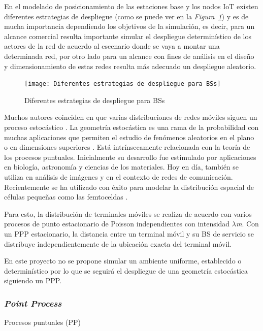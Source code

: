 En el modelado de posicionamiento de las estaciones base y los nodos IoT existen diferentes estrategias de despliegue (como se puede ver en la \textit{Figura~\ref{fig:BSs}}) y es de mucha importancia dependiendo los objetivos de la simulación, es decir, para un alcance comercial resulta importante simular el despliegue determinístico de los actores de la red de acuerdo al escenario donde se vaya a montar una determinada red, por otro lado para un alcance con fines de análisis en el diseño y dimensionamiento de estas redes resulta más adecuado un despliegue aleatorio. \newline

\begin{figure}[th]
\centering
\texttt{[image: Diferentes estrategias de despliegue para BSs]}
\decoRule
\caption[Diferentes estrategias de despliegue para BSs]{Diferentes estrategias de despliegue para BSs}
\label{fig:BSs}
\end{figure}

Muchos autores coinciden en que varias distribuciones de redes móviles siguen un proceso estocástico \parencite{Kouzayha2018}\parencite{Zhang2017}. La geometría estocástica es una rama de la probabilidad con muchas aplicaciones que permiten el estudio de fenómenos aleatorios en el plano o en dimensiones superiores \parencite{Haenggi2009}. Está intrínsecamente relacionada con la teoría de los procesos puntuales. Inicialmente su desarrollo fue estimulado por aplicaciones en biología, astronomía y ciencias de los materiales. Hoy en día, también se utiliza en análisis de imágenes y en el contexto de redes de comunicación. Recientemente se ha utilizado con éxito para modelar la distribución espacial de células pequeñas como las femtoceldas \parencite{TurjmanSmallCells}. \newline

Para esto, la distribución de terminales móviles se realiza de acuerdo con varios procesos de punto estacionario de Poisson independientes con intensidad \textit{$\lambda$m}. Con un PPP estacionario, la distancia entre un terminal móvil y su BS de servicio se distribuye independientemente de la ubicación exacta del terminal móvil.\newline

En este proyecto no se propone simular un ambiente uniforme, establecido o determinístico por lo que se seguirá el despliegue de una geometría estocástica siguiendo un PPP.\newline

\subsubsection{\textit{Point Process}}
Procesos puntuales (PP) \parencite{Haenggi2009}\newline

